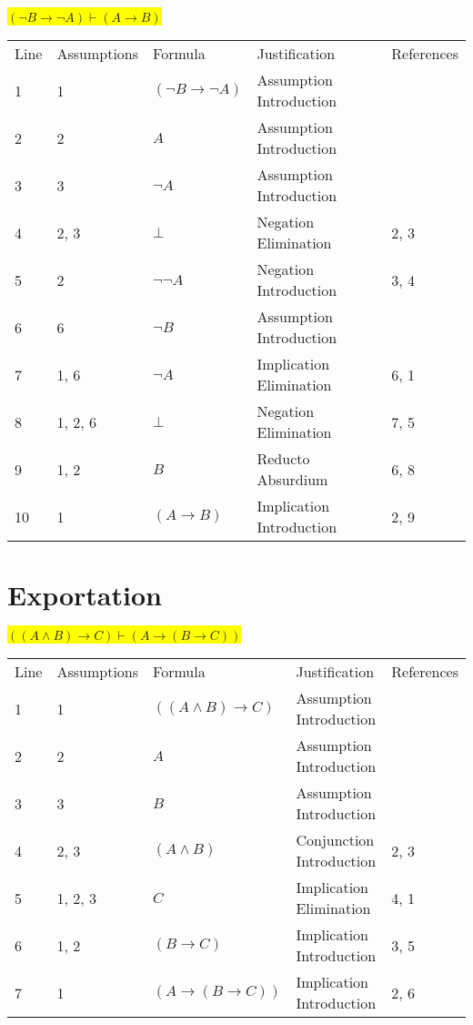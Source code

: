 \documentclass[12pt]{article}
\newcommand{\pr}[1]{\bigbreak \colorbox{Yellow}{$#1$} \smallbreak}
\begin{document}
\begin{flushleft}
\pr{(\neg B \rightarrow \neg A) \vdash (A \rightarrow B)}
\begin{tabular}{lllll}
    Line & Assumptions & Formula & Justification & References \\
    1 & 1 & $(\neg B\rightarrow \neg A)$  & Assumption Introduction &  \\
    2 & 2 & $A$  & Assumption Introduction &  \\
    3 & 3 & $\neg A$  & Assumption Introduction &  \\
    4 & 2, 3 & $\bot $  & Negation Elimination & 2, 3 \\
    5 & 2 & $\neg \neg A$  & Negation Introduction & 3, 4 \\
    6 & 6 & $\neg B$  & Assumption Introduction &  \\
    7 & 1, 6 & $\neg A$  & Implication Elimination & 6, 1 \\
    8 & 1, 2, 6 & $\bot $  & Negation Elimination & 7, 5 \\
    9 & 1, 2 & $B$  & Reducto Absurdium & 6, 8 \\
    10 & 1 & $(A\rightarrow B)$  & Implication Introduction & 2, 9 \\
\end{tabular}

\section{Exportation}
\pr{((A \land B) \rightarrow C) \vdash (A \rightarrow (B \rightarrow C))}
\begin{tabular}{lllll}
    Line & Assumptions & Formula & Justification & References \\
    1 & 1 & $((A\land B)\rightarrow C)$  & Assumption Introduction &  \\
    2 & 2 & $A$  & Assumption Introduction &  \\
    3 & 3 & $B$  & Assumption Introduction &  \\
    4 & 2, 3 & $(A\land B)$  & Conjunction Introduction & 2, 3 \\
    5 & 1, 2, 3 & $C$  & Implication Elimination & 4, 1 \\
    6 & 1, 2 & $(B\rightarrow C)$  & Implication Introduction & 3, 5 \\
    7 & 1 & $(A\rightarrow (B\rightarrow C))$  & Implication Introduction & 2, 6 \\
\end{tabular}


\end{flushleft}
\end{document}
